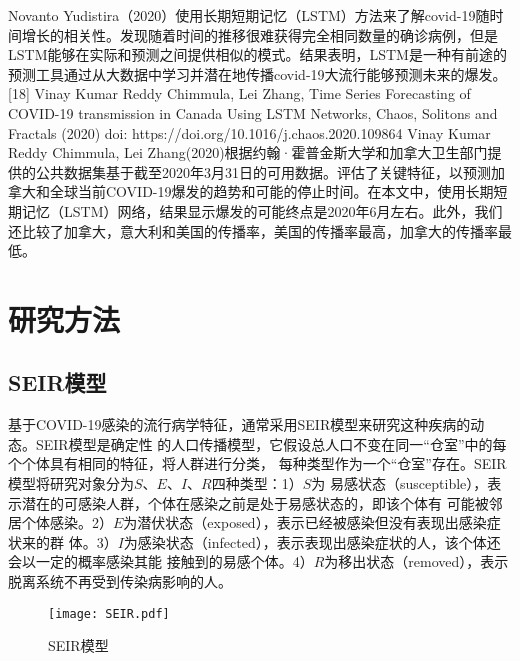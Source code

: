 \documentclass[lang=cn,11pt,a4paper,cite=authoryear]{elegantpaper}
\begin{document}
Novanto Yudistira（2020）使用长期短期记忆（LSTM）方法来了解covid-19随时间增长的相关性。发现随着时间的推移很难获得完全相同数量的确诊病例，但是LSTM能够在实际和预测之间提供相似的模式。结果表明，LSTM是一种有前途的预测工具通过从大数据中学习并潜在地传播covid-19大流行能够预测未来的爆发。
[18] Vinay Kumar Reddy Chimmula, Lei Zhang, Time Series Forecasting of COVID-19 transmission in Canada Using LSTM Networks, Chaos, Solitons and Fractals (2020) doi: https://doi.org/10.1016/j.chaos.2020.109864
Vinay Kumar Reddy Chimmula, Lei Zhang(2020)根据约翰·霍普金斯大学和加拿大卫生部门提供的公共数据集基于截至2020年3月31日的可用数据。评估了关键特征，以预测加拿大和全球当前COVID-19爆发的趋势和可能的停止时间。在本文中，使用长期短期记忆（LSTM）网络，结果显示爆发的可能终点是2020年6月左右。此外，我们还比较了加拿大，意大利和美国的传播率，美国的传播率最高，加拿大的传播率最低。

\section{研究方法}

\subsection{SEIR模型}

基于COVID-19感染的流行病学特征，通常采用SEIR模型来研究这种疾病的动态。SEIR模型是确定性
的人口传播模型，它假设总人口不变在同一“仓室”中的每个个体具有相同的特征，将人群进行分类，
每种类型作为一个“仓室”存在。SEIR模型将研究对象分为$S$、$E$、$I$、$R$四种类型：1）$S$为
易感状态（susceptible），表示潜在的可感染人群，个体在感染之前是处于易感状态的，即该个体有
可能被邻居个体感染。2）$E$为潜伏状态（exposed），表示已经被感染但没有表现出感染症状来的群
体。3）$I$为感染状态（infected），表示表现出感染症状的人，该个体还会以一定的概率感染其能
接触到的易感个体。4）$R$为移出状态（removed），表示脱离系统不再受到传染病影响的人。

\begin{figure}
	\centering
	\texttt{[image: SEIR.pdf]}
	\caption{SEIR模型}
	\label{fig:SEIR}
\end{figure}
\end{document}
